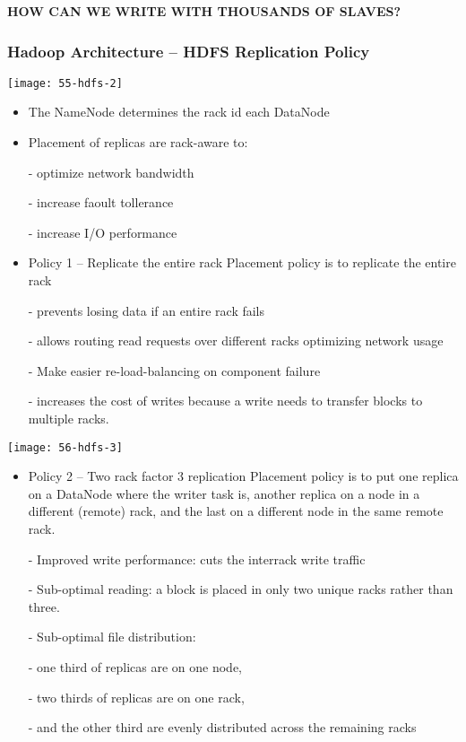\textbf{HOW CAN WE WRITE WITH THOUSANDS OF SLAVES?}

\subsubsection{Hadoop Architecture – HDFS Replication Policy}

\begin{center}
\texttt{[image: 55-hdfs-2]}
\end{center}

\begin{itemize}
	\item The NameNode determines the rack id each DataNode
	\item Placement of replicas are rack-aware to:

	- optimize network bandwidth

	- increase faoult tollerance

	- increase I/O performance
	\item Policy 1 – Replicate the entire rack Placement policy is to replicate the entire rack

	- prevents losing data if an entire rack fails

	- allows routing read requests over different racks optimizing network usage

	- Make easier re-load-balancing on component failure

	- increases the cost of writes because a write needs to transfer blocks to multiple racks.
\end{itemize}

\begin{center}
\texttt{[image: 56-hdfs-3]}
\end{center}

\begin{itemize}
	\item Policy 2 – Two rack factor 3 replication Placement policy is to put one replica on a DataNode where the writer task is, another replica on a node in a different (remote) rack, and the last on a different node in the same remote rack.

	- Improved write performance: cuts the interrack write traffic

	- Sub-optimal reading: a block is placed in only two unique racks rather than three.

	- Sub-optimal file distribution:

		- one third of replicas are on one node,

		- two thirds of replicas are on one rack,

		- and the other third are evenly distributed across the remaining racks
\end{itemize}

